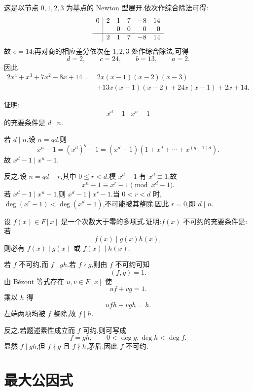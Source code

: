 \begin{solution}
这是以节点 $0,1,2,3$ 为基点的 Newton 型展开.依次作综合除法可得:
\[
\begin{array}{c|rrrrr}
0&2&1&7&-8&14\\
 & &0&0&0&0\\ \hline
 &2&1&7&-8&14
\end{array}
\]
故 $e=14$;再对商的相应差分依次在 $1,2,3$ 处作综合除法,可得
\[
  d=2,\qquad c=24,\qquad b=13,\qquad a=2.
\]
因此
\[
\begin{aligned}
2x^4+x^3+7x^2-8x+14
={}&2x(x-1)(x-2)(x-3)\\
&+13x(x-1)(x-2)+24x(x-1)+2x+14.
\end{aligned}
\]
\end{solution}

\begin{example}[\markstar]
证明:
\[
  x^d-1\mid x^n-1
\]
的充要条件是 $d\mid n$.
\end{example}
\exampleblank

\begin{solution}
若 $d\mid n$,设 $n=qd$,则
\[
  x^n-1=(x^d)^q-1
  =(x^d-1)\left(1+x^d+\cdots+x^{(q-1)d}\right).
\]
故 $x^d-1\mid x^n-1$.

反之,设 $n=qd+r$,其中 $0\le r<d$.模 $x^d-1$ 有 $x^d\equiv1$,故
\[
  x^n-1\equiv x^r-1\pmod{x^d-1}.
\]
若 $x^d-1\mid x^n-1$,则 $x^d-1\mid x^r-1$.当 $0<r<d$ 时,
$\deg(x^r-1)<\deg(x^d-1)$,不可能被其整除.因此 $r=0$,即 $d\mid n$.
\end{solution}

\begin{example}
设 $f(x)\in F[x]$ 是一个次数大于零的多项式.证明:$f(x)$ 不可约的充要条件是:
若
\[
  f(x)\mid g(x)h(x),
\]
则必有 $f(x)\mid g(x)$ 或 $f(x)\mid h(x)$.
\end{example}
\exampleblank

\begin{solution}
若 $f$ 不可约,而 $f\mid gh$.若 $f\nmid g$,则由 $f$ 不可约可知
\[
  (f,g)=1.
\]
由 Bézout 等式存在 $u,v\in F[x]$ 使
\[
  uf+vg=1.
\]
乘以 $h$ 得
\[
  ufh+vgh=h.
\]
左端两项均被 $f$ 整除,故 $f\mid h$.

反之,若题述素性成立而 $f$ 可约,则可写成
\[
  f=gh,
  \qquad
  0<\deg g,\deg h<\deg f.
\]
显然 $f\mid gh$,但 $f\nmid g$ 且 $f\nmid h$,矛盾.因此 $f$ 不可约.
\end{solution}


\newpage

\section{最大公因式}

